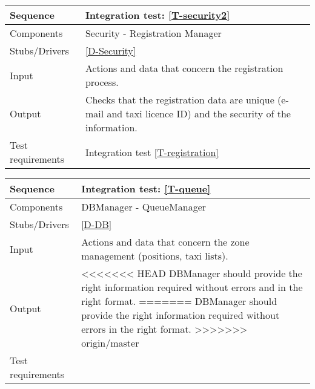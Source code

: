 \begin{table}[H]
    \begin{tabularx}{\textwidth}{l|X}
        \hline
        Sequence
        & 
        Integration test: \ref{T-security2}
        \\ \hline
        Components 
        & 
        Security - Registration Manager
        \\ \hline
        Stubs/Drivers 
        & 
        \ref{D-Security}
        \\ \hline
        Input 
        & 
        Actions and data that concern the registration process. 
        \\ \hline
        Output 
        & 
        Checks that the registration data are unique (e-mail and taxi licence ID) and the security of the information.
        \\ \hline
        Test requirements 
        & 
        Integration test \ref{T-registration}
        \\ \hline
    \end{tabularx}
\end{table}

\begin{table}[H]
    \begin{tabularx}{\textwidth}{l|X}
        \hline
        Sequence
        & 
        Integration test: \ref{T-queue}
        \\ \hline
        Components 
        & 
        DBManager - QueueManager
        \\ \hline
        Stubs/Drivers 
        & 
        \ref{D-DB}
        \\ \hline
        Input 
        & 
        Actions and data that concern the zone management (positions, taxi lists). 
        \\ \hline
        Output 
        & 
<<<<<<< HEAD
        DBManager should provide the right information required without errors and in the right format.
=======
        DBManager should provide the right information required without errors in the right format.
>>>>>>> origin/master
        \\ \hline
        Test requirements 
        & 
        
        \\ \hline
    \end{tabularx}
\end{table}

